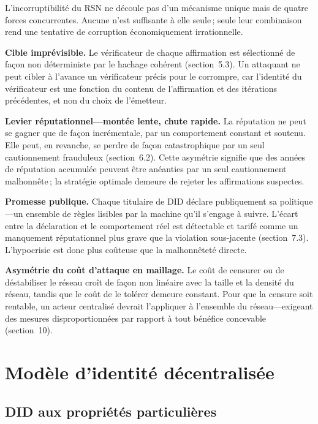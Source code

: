 \documentclass[11pt,a4paper,twocolumn]{article}
\begin{document}
L'incorruptibilité du RSN ne découle pas d'un mécanisme unique mais de quatre forces concurrentes. Aucune n'est suffisante à elle seule\,; seule leur combinaison rend une tentative de corruption économiquement irrationnelle.

\textbf{Cible imprévisible.} Le vérificateur de chaque affirmation est sélectionné de façon non déterministe par le hachage cohérent (section~5.3). Un attaquant ne peut cibler à l'avance un vérificateur précis pour le corrompre, car l'identité du vérificateur est une fonction du contenu de l'affirmation et des itérations précédentes, et non du choix de l'émetteur.

\textbf{Levier réputationnel---montée lente, chute rapide.} La réputation ne peut se gagner que de façon incrémentale, par un comportement constant et soutenu. Elle peut, en revanche, se perdre de façon catastrophique par un seul cautionnement frauduleux (section~6.2). Cette asymétrie signifie que des années de réputation accumulée peuvent être anéanties par un seul cautionnement malhonnête\,; la stratégie optimale demeure de rejeter les affirmations suspectes.

\textbf{Promesse publique.} Chaque titulaire de DID déclare publiquement sa politique---un ensemble de règles lisibles par la machine qu'il s'engage à suivre. L'écart entre la déclaration et le comportement réel est détectable et tarifé comme un manquement réputationnel plus grave que la violation sous-jacente (section~7.3). L'hypocrisie est donc plus coûteuse que la malhonnêteté directe.

\textbf{Asymétrie du coût d'attaque en maillage.} Le coût de censurer ou de déstabiliser le réseau croît de façon non linéaire avec la taille et la densité du réseau, tandis que le coût de le tolérer demeure constant. Pour que la censure soit rentable, un acteur centralisé devrait l'appliquer à l'ensemble du réseau---exigeant des mesures disproportionnées par rapport à tout bénéfice concevable (section~10).

\section{Modèle d'identité décentralisée}

\subsection{DID aux propriétés particulières}
\end{document}
